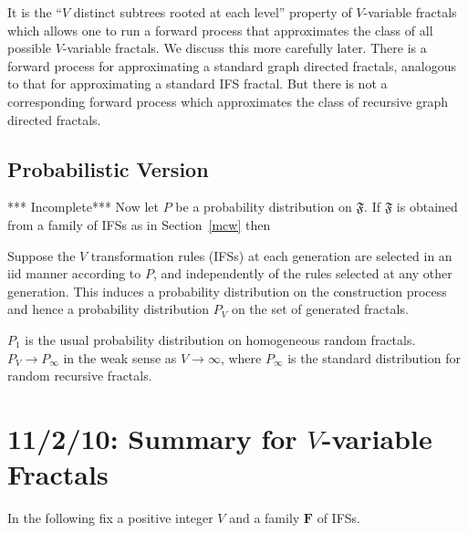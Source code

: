\documentclass[a4paper]{amsart}
\theoremstyle{plain}
\theoremstyle{definition}
\theoremstyle{remark}
\begin{document}
It is the ``$ V $ distinct subtrees rooted at each level'' property of   $ V $-variable fractals which allows one to run a forward process that approximates the class of all possible $ V $-variable fractals.  We discuss this more carefully later.
  There is a forward process for  approximating  a standard graph directed fractals, analogous to that for approximating a standard IFS fractal.  But there is not a corresponding forward process which approximates the class of recursive graph directed fractals.




\subsection{Probabilistic Version}  *** Incomplete***
Now let $ P $ be  a probability distribution   on   $ \mathfrak{F} $.   If $ \mathfrak{F} $ is obtained from a family of IFSs as in Section~\ref{mcw} then 




Suppose the $ V $ transformation rules (IFSs) at each generation are selected in an iid manner according to $ P $,   and  independently of the rules selected  at any other generation. This induces a probability distribution  on the construction process and hence a probability distribution $ P_V $ on the set of generated fractals.   

 $ P_1 $ is the usual probability distribution on homogeneous random fractals.  $ P_V \to  P_\infty $ in the weak sense as $ V \to \infty $, where $ P_\infty $ is the standard distribution for random recursive fractals.  

\section{\textbf{11/2/10: Summary for $ V $-variable Fractals}} 

 In the following   fix a positive integer $ V $ and a family $ \boldsymbol{F} $ of IFSs.
\end{document}
